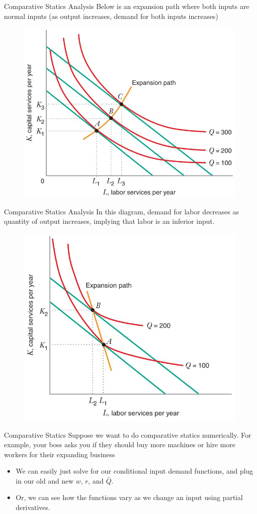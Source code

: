 \documentclass[11pt,t]{beamer}
\begin{document}
\begin{frame}{Comparative Statics Analysis}
  Below is an expansion path where both inputs are normal inputs (as output increases, demand for both inputs increases)

  \begin{figure}
    \includegraphics[width=0.6\linewidth]{figures/fig7_8.jpg}
  \end{figure}
\end{frame}

\begin{frame}{Comparative Statics Analysis}
  In this diagram, demand for labor decreases as quantity of output increases, implying that labor is an inferior input.

  \begin{figure}
    \includegraphics[width=0.6\linewidth]{figures/fig7_9.jpg}
  \end{figure}
\end{frame}

\begin{frame}{Comparative Statics}
  Suppose we want to do comparative statics numerically. For example, your boss asks you if they should buy more machines or hire more workers for their expanding business


  \begin{itemize}
    \item We can easily just solve for our conditional input demand functions, and plug in our old and new $w$, $r$, and $\bar{Q}$.
    
    \item Or, we can see how the functions vary as we change an input using partial derivatives.
  \end{itemize}
\end{frame}
\end{document}
